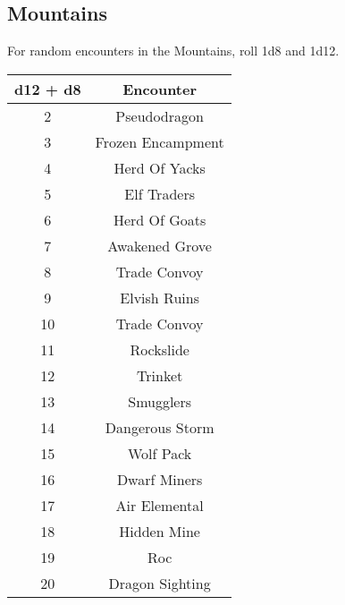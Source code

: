 \subsection{Mountains}

For random encounters in the Mountains, roll 1d8 and 1d12.

\begin{tabular}{|c|c|}

\hline

\textbf{d12 + d8} & \textbf{Encounter}\\

\hline

2 & Pseudodragon\\

3 & Frozen Encampment\\

4 & Herd Of Yacks\\

5 & Elf Traders\\

6 & Herd Of Goats\\

7 & Awakened Grove\\

8 & Trade Convoy\\

9 & Elvish Ruins\\

10 & Trade Convoy\\

11 & Rockslide\\

12 & Trinket\\

13 & Smugglers\\

14 & Dangerous Storm\\

15 & Wolf Pack\\

16 & Dwarf Miners\\

17 & Air Elemental\\

18 & Hidden Mine\\

19 & Roc\\

20 & Dragon Sighting\\

\hline

\end{tabular}

